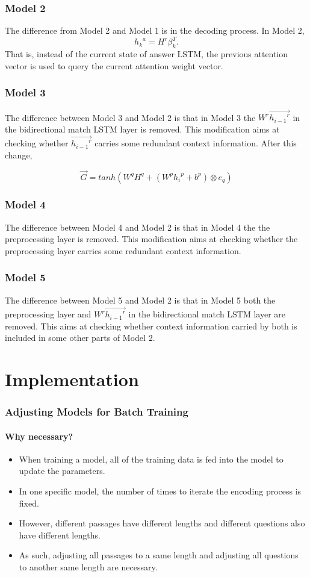 \documentclass{beamer}
\begin{document}
\begin{frame} \frametitle{Model 2}
    The difference from Model 2 and Model 1 is in the decoding process. In Model 2,
    $${h_k}^a = H^r\beta _{k}^T.$$
    That is, instead of the current state of answer LSTM, the previous attention vector is used to query the current attention weight vector.
\end{frame}

\begin{frame} \frametitle{Model 3}
    The difference between Model 3 and Model 2 is that in Model 3 the $W^r\overrightarrow{{h_{i-1}}^r}$ in the bidirectional match LSTM layer is removed. This modification aims at checking whether $\overrightarrow{{h_{i-1}}^r}$ carries some redundant context information. After this change,


    $$\overrightarrow{G} = tanh(W^qH^q + (W^p{h_i}^p + b^p) \otimes e_q)$$
\end{frame}

\begin{frame} \frametitle{Model 4}
    The difference between Model 4 and Model 2 is that in Model 4 the the preprocessing layer is removed. This modification aims at checking whether the preprocessing layer carries some redundant context information.
\end{frame}

\begin{frame} \frametitle{Model 5}
    The difference between Model 5 and Model 2 is that in Model 5 both the preprocessing layer and $W^r\overrightarrow{{h_{i-1}}^r}$ in the bidirectional match LSTM layer are removed. This aims at checking whether context information carried by both is included in some other parts of Model 2.
\end{frame}

\section{Implementation}

\begin{frame} \frametitle{Adjusting Models for Batch Training}\framesubtitle{Why necessary?}
    \begin{itemize}
        \item When training a model, all of the training data is fed into the model to update the parameters.
        \item In one specific model, the number of times to iterate the encoding process is fixed.
        \item However, different passages have different lengths and different questions also have different lengths.
        \item As such, adjusting all passages to a same length and adjusting all questions to another same length are necessary.
    \end{itemize}
\end{frame}
\end{document}
